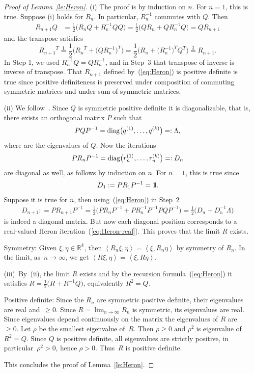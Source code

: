 \documentclass[pdftex]{sigma}
\numberwithin{equation}{section}
\newcommand{\R}{{\mathbb{R}}}
\newcommand{\diag}{{\rm diag}} %
\newcommand{\INNER}[2]{\left\langle #1, #2\right\rangle}
\newcommand{\1}{{{\mathchoice {\rm 1\mskip-4mu l} {\rm 1\mskip-4mu l}
{\rm 1\mskip-4.5mu l} {\rm 1\mskip-5mu l}}}}
\begin{document}
\begin{proof}[Proof of Lemma~\ref{le:Heron}]
(i) The proof is by induction on $n$. For $n=1$, this is true.
Suppose (i) holds for $R_n$. In particular, $R_n^{-1}$ commutes with $Q$.
Then
\begin{equation*}
\begin{split}
 R_{n+1}Q
 &=\frac12 \bigl(R_nQ+R_n^{-1} QQ \bigr)
 =\frac12 \bigl(QR_n+QR_n^{-1} Q \bigr)
 =QR_{n+1}
\end{split}
\end{equation*}
and the transpose satisfies
\[
 {R_{n+1}}^T
 \stackrel{1}{=}\frac12\bigl({R_n}^T+\bigl(QR_n^{-1}\bigr)^T\bigr)
 =\frac12\bigl(R_n+\bigl(R_n^{-1}\bigr)^TQ^T\bigr)
 \stackrel{3}{=} R_{n+1}
 .
\]
In Step 1, we used $R_n^{-1}Q=QR_n^{-1}$,
and in Step~3 that transpose of inverse is inverse of transpose.
That $R_{n+1}$ defined by~(\ref{eq:Heron})
is positive definite is true since positive definiteness
is preserved under composition of commuting symmetric matrices
and under sum of symmetric matrices.

(ii)
We follow~\cite{Higham:1986a}.
Since $Q$ is symmetric positive definite it is diagonalizable, that is,
there exists an orthogonal matrix $P$ such that
\[
 PQP^{-1}=\diag\bigl(q^{(1)},\dots,q^{(k)}\bigr)=:\Lambda,
\]
where
\smash{$q^{(1)},\dots,q^{(k)}\in\R\setminus\{0\}$} are the eigenvalues of $Q$.
Now the iterations
\[
 PR_nP^{-1}=\diag\bigl(r_n^{(1)},\dots,r_n^{(k)}\bigr)=:D_n
\]
are diagonal as well, as follows by induction on $n$.
For $n=1$, this is true since
\[
D_1:=PR_1P^{-1}=\1.
\]
Suppose it is true for $n$, then using~(\ref{eq:Heron}) in Step~2
\begin{equation*}
\begin{split}
 D_{n+1}:
 =PR_{n+1}P^{-1}
 =\frac12\bigl(PR_nP^{-1}+PR_n^{-1}P^{-1}P QP^{-1}\bigr)
 =\frac12\bigl(D_n+D_n^{-1} \Lambda\bigr)
\end{split}
\end{equation*}
is indeed a diagonal matrix.
But now each diagonal position corresponds to a real-valued Heron
iteration~(\ref{eq:Heron-real}). This proves that the limit $R$ exists.

Symmetry: Given $\xi,\eta\in\R^k$, then
$\INNER{R_n\xi}{\eta}=\INNER{\xi}{R_n\eta}$ by symmetry of $R_n$.
In the limit, as~${n\to\infty}$, we get
$\INNER{R\xi}{\eta}=\INNER{\xi}{R\eta}$.

(iii)~By~(ii), the limit $R$ exists and by the recursion
formula~(\ref{eq:Heron}) it satisfies
$R=\frac12\bigl(R+R^{-1} Q\bigr)$,
equivalently $R^2=Q$.

Positive definite:
Since the $R_n$ are symmetric positive definite,
their eigenvalues are real and~${\ge 0}$.
Since $R=\lim_{n\to\infty} R_n$ is symmetric,
its eigenvalues are real. Since eigenvalues depend continuously
on the matrix the eigenvalues of $R$ are $\ge 0$.
Let $\rho$ be the smallest eigenvalue of~$R$.
Then $\rho\ge 0$ and $\rho^2$ is eigenvalue of $R^2=Q$.
Since $Q$ is positive definite, all eigenvalues are
strictly positive, in particular~$\rho^2>0$, hence $\rho>0$.
Thus~$R$ is positive definite.

This concludes the proof of Lemma~\ref{le:Heron}.
\end{proof}
\end{document}
